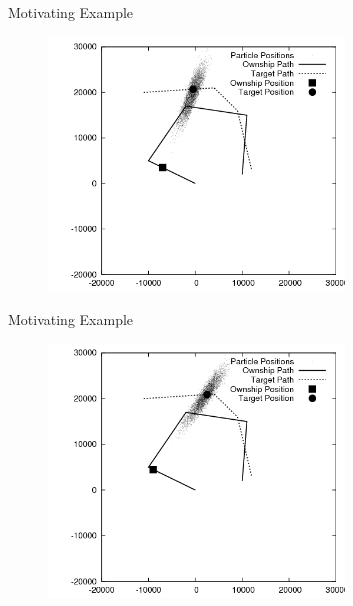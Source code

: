 \documentclass{beamer}
\begin{document}
\begin{frame}{Motivating Example}
\begin{figure}
\centering
\includegraphics[width=0.7\textwidth]{data/azimuth_only_700.png}
\end{figure}
\end{frame}


\begin{frame}{Motivating Example}
\begin{figure}
\centering
\includegraphics[width=0.7\textwidth]{data/azimuth_only_900.png}
\end{figure}
\end{frame}

\end{document}
